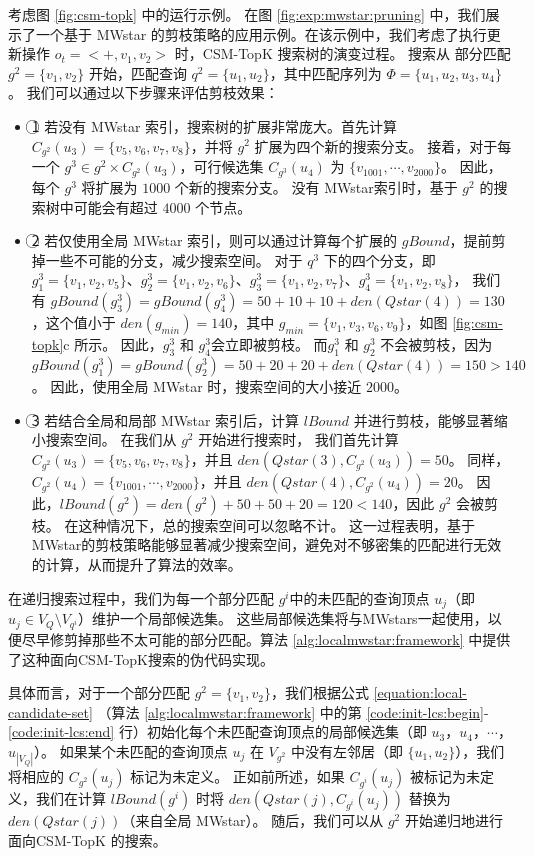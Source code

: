 考虑图 \ref{fig:csm-topk} 中的运行示例。
在图 \ref{fig:exp:mwstar:pruning} 中，我们展示了一个基于 MWstar 的剪枝策略的应用示例。在该示例中，我们考虑了执行更新操作 $o_t = <+,v_1,v_2>$ 时，CSM-TopK 搜索树的演变过程。
搜索从 部分匹配$g^2=\{v_1, v_2\}$ 开始，匹配查询 $q^2=\{u_1, u_2\}$，其中匹配序列为 $\Phi=\{u_1, u_2, u_3, u_4\}$。
我们可以通过以下步骤来评估剪枝效果：
\begin{itemize}
\item
\textcircled{1} 若没有 MWstar 索引，搜索树的扩展非常庞大。首先计算 $C_{g^2}(u_3)=\{v_5, v_6, v_7, v_8\}$，并将 $g^2$ 扩展为四个新的搜索分支。
接着，对于每一个 $g^3 \in g^2 \times C_{g^2}(u_3)$，可行候选集 $C_{g^3}(u_4)$ 为 $\{v_{1001}, \cdots, v_{2000}\}$。
因此，每个 $g^3$ 将扩展为 $1000$ 个新的搜索分支。
没有 MWstar索引时，基于 $g^2$ 的搜索树中可能会有超过 $4000$ 个节点。
\item
\textcircled{2} 若仅使用全局 MWstar 索引，则可以通过计算每个扩展的 $gBound$，提前剪掉一些不可能的分支，减少搜索空间。
对于 $q^3$ 下的四个分支，即 $g_1^3=\{v_1, v_2, v_5\}$、$g_2^3=\{v_1, v_2, v_6\}$、$g_3^3=\{v_1, v_2, v_7\}$、$g_4^3=\{v_1, v_2, v_8\}$，
我们有 $gBound(g_3^3)=gBound(g_4^3)=50+10+10+den(Qstar(4))=130$，这个值小于 $den(g_{min})=140$，其中 $g_{min}=\{v_1, v_3, v_6, v_9\}$，如图 \ref{fig:csm-topk}c 所示。
因此，$g_3^3$ 和 $g_4^3$会立即被剪枝。
而$g_1^3$ 和 $g_2^3$ 不会被剪枝，因为 $gBound(g_1^3) = gBound(g_2^3) = 50+20+20+den(Qstar(4)) = 150 > 140$。
因此，使用全局 MWstar 时，搜索空间的大小接近 $2000$。
\item
\textcircled{3} 若结合全局和局部 MWstar 索引后，计算 $lBound$ 并进行剪枝，能够显著缩小搜索空间。
在我们从 $g^2$ 开始进行搜索时，
我们首先计算 $C_{g^2}(u_3)=\{v_5, v_6, v_7, v_8\}$，并且 $den(Qstar(3), C_{g^2}(u_3)) = 50$。
同样，$C_{g^2}(u_4)=\{v_{1001}, \cdots, v_{2000}\}$，并且 $den(Qstar(4), C_{g^2}(u_4)) = 20$。
因此，$lBound(g^2)=den(g^2)+50+50+20=120<140$，因此 $g^2$ 会被剪枝。
在这种情况下，总的搜索空间可以忽略不计。
这一过程表明，基于MWstar的剪枝策略能够显著减少搜索空间，避免对不够密集的匹配进行无效的计算，从而提升了算法的效率。
\end{itemize}

在递归搜索过程中，我们为每一个部分匹配 $g^i$中的未匹配的查询顶点 $u_j$（即 $u_j \in V_Q \setminus V_{q^i}$）维护一个局部候选集。
这些局部候选集将与MWstars一起使用，以便尽早修剪掉那些不太可能的部分匹配。算法 \ref{alg:localmwstar:framework} 中提供了这种面向CSM-TopK搜索的伪代码实现。

具体而言，对于一个部分匹配 $g^2 = \{v_1, v_2\}$，我们根据公式 \ref{equation:local-candidate-set} （算法 \ref{alg:localmwstar:framework} 中的第 \ref{code:init-lcs:begin}-\ref{code:init-lcs:end} 行）初始化每个未匹配查询顶点的局部候选集（即 $u_3$，$u_4$，$\cdots$，$u_{|V_Q|}$）。
如果某个未匹配的查询顶点 $u_j$ 在 $V_{g^2}$ 中没有左邻居（即 $\{u_1, u_2\}$），我们将相应的 $C_{g^2}(u_j)$ 标记为未定义。
正如前所述，如果 $C_{g^i}(u_j)$ 被标记为未定义，我们在计算 $lBound(g^i)$ 时将 $den(Qstar(j), C_{g^i}(u_j))$ 替换为 $den(Qstar(j))$（来自全局 MWstar）。
随后，我们可以从 $g^2$ 开始递归地进行 面向CSM-TopK 的搜索。

